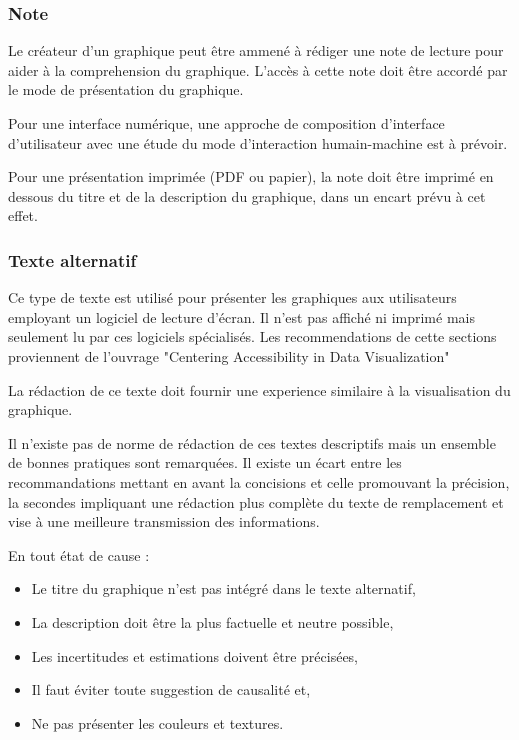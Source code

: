 \documentclass[a4paper,12pt]{article}
\begin{document}
\begin{multicols}{2}
\subsubsection*{Note}
\label{sec:orgbd69940}
Le créateur d'un graphique peut être ammené à rédiger une note de lecture pour aider à la comprehension du graphique. L'accès à cette note doit être accordé par le mode de présentation du graphique. \autocite{jonathanschwabishDevelopingDataVisualization2021}

Pour une interface numérique, une approche de composition d'interface d'utilisateur avec une étude du mode d'interaction humain-machine est à prévoir.

Pour une présentation imprimée (PDF ou papier), la note doit être imprimé en dessous du titre et de la description du graphique, dans un encart prévu à cet effet.
\subsubsection*{Texte alternatif}
\label{sec:org84533e6}
Ce type de texte est utilisé pour présenter les graphiques aux utilisateurs employant un logiciel de lecture d'écran. Il n'est pas affiché ni imprimé mais seulement lu par ces logiciels spécialisés.
Les recommendations de cette sections proviennent de l'ouvrage "Centering Accessibility in Data Visualization" \autocite{schwabishNotHarmGuide2022}

La rédaction de ce texte doit fournir une experience similaire à la visualisation du graphique.

Il n'existe pas de norme de rédaction de ces textes descriptifs mais un ensemble de bonnes pratiques sont remarquées. Il existe un écart entre les recommandations mettant en avant la concisions et celle promouvant la précision, la secondes impliquant une rédaction plus complète du texte de remplacement et vise à une meilleure transmission des informations.

En tout état de cause :
\begin{itemize}
\item Le titre du graphique n'est pas intégré dans le texte alternatif,
\item La description doit être la plus factuelle et neutre possible,
\item Les incertitudes et estimations doivent être précisées,
\item Il faut éviter toute suggestion de causalité et,
\item Ne pas présenter les couleurs et textures.
\end{itemize}


\end{multicols}
\end{document}
